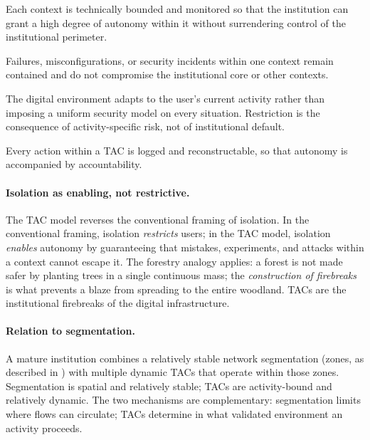 \begin{description}[leftmargin=2em,nosep,style=nextline,font=\bfseries]
  \item[Trustworthiness] Each context is technically bounded
    and monitored so that the institution can grant a high
    degree of autonomy within it without surrendering control
    of the institutional perimeter.
  \item[Dependability] Failures, misconfigurations, or security
    incidents within one context remain contained and do not
    compromise the institutional core or other contexts.
  \item[User-centricity] The digital environment adapts to the
    user's current activity rather than imposing a uniform
    security model on every situation. Restriction is the
    consequence of activity-specific risk, not of
    institutional default.
  \item[Observability] Every action within a TAC is logged and
    reconstructable, so that autonomy is accompanied by
    accountability.
\end{description}

\paragraph{Isolation as enabling, not restrictive.} The TAC
model reverses the conventional framing of isolation. In the
conventional framing, isolation \emph{restricts} users; in the
TAC model, isolation \emph{enables} autonomy by guaranteeing
that mistakes, experiments, and attacks within a context cannot
escape it. The forestry analogy applies: a forest is not made
safer by planting trees in a single continuous mass; the
\emph{construction of firebreaks} is what prevents a blaze from
spreading to the entire woodland. TACs are the institutional
firebreaks of the digital infrastructure.

\paragraph{Relation to segmentation.} A mature institution
combines a relatively stable network segmentation (zones, as
described in ) with multiple dynamic TACs
that operate within those zones. Segmentation is spatial and
relatively stable; TACs are activity-bound and relatively
dynamic. The two mechanisms are complementary: segmentation
limits where flows can circulate; TACs determine in what
validated environment an activity proceeds.


